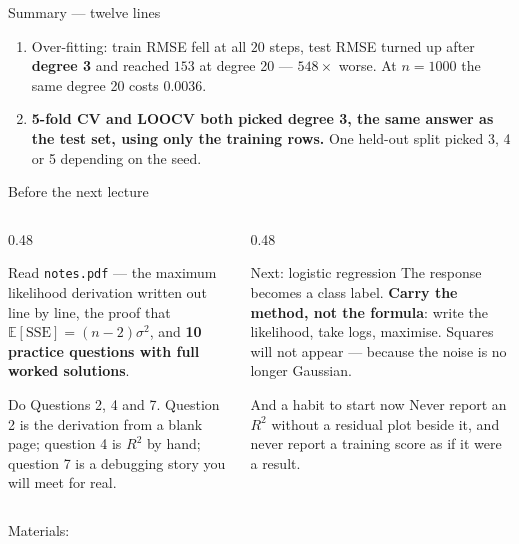 \documentclass[aspectratio=169]{beamer}
\begin{document}
\begin{frame}[shrink=16]{Summary --- twelve lines}
\begin{enumerate}
      $R^2 = 0.666$. The residual plot separates them: curvature $R^2 = 1.0000$
      for II, largest residual $2.80\times$ the next for III, leverage
      $1.0000$ for IV.
    \item Over-fitting: train RMSE fell at all $20$ steps, test RMSE turned up
      after \textbf{degree 3} and reached $153$ at degree 20 --- $548\times$
      worse. At $n = 1000$ the same degree 20 costs $0.0036$.
    \item \textbf{5-fold CV and LOOCV both picked degree 3, the same answer as
      the test set, using only the training rows.} One held-out split picked
      3, 4 or 5 depending on the seed.
  \end{enumerate}
\end{frame}

\begin{frame}[shrink=3]{Before the next lecture}
  \begin{columns}[T]
    \begin{column}{0.48\textwidth}
      \begin{block}{Read}
        \texttt{notes.pdf} --- the maximum likelihood derivation written out
        line by line, the proof that $\mathbb{E}[\mathrm{SSE}] =
        (n-2)\sigma^2$, and \textbf{10 practice questions with full worked
        solutions}.
      \end{block}
      \begin{block}{Do}
        Questions 2, 4 and 7. Question 2 is the derivation from a blank page;
        question 4 is $R^2$ by hand; question 7 is a debugging story you will
        meet for real.
      \end{block}
    \end{column}
    \begin{column}{0.48\textwidth}
      \begin{exampleblock}{Next: logistic regression}
        The response becomes a class label. \textbf{Carry the method, not the
        formula}: write the likelihood, take logs, maximise. Squares will not
        appear --- because the noise is no longer Gaussian.
      \end{exampleblock}
      \begin{alertblock}{And a habit to start now}
        Never report an $R^2$ without a residual plot beside it, and never
        report a training score as if it were a result.
      \end{alertblock}
    \end{column}
  \end{columns}
  \begin{center}
    \small Materials: \texttt{\AMLRepoURL}
  \end{center}
  \slidesources{\AMLUnitVSources}
\end{frame}
\end{document}
